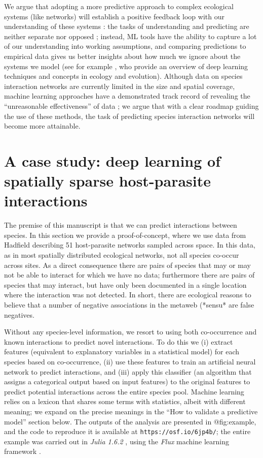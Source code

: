 We argue that adopting a more predictive approach to complex ecological
systems (like networks) will establish a positive feedback loop with our
understanding of these systems \cite{Houlahan2017PriPre}: the tasks of
understanding and predicting are neither separate nor opposed
\cite{Maris2017PreEco}; instead, ML tools have the ability to capture a
lot of our understanding into working assumptions, and comparing
predictions to empirical data gives us better insights about how much we
ignore about the systems we model (see for example
\cite{Borowiec2021DeeLea}, who provide an overview of deep learning techniques
and concepts in ecology and evolution). Although data on species
interaction networks are currently limited in the size and spatial
coverage, machine learning approaches have a demonstrated track record
of revealing the ``unreasonable effectiveness'' of data
\cite{Halevy2009UnrEff}; we argue that with a clear roadmap guiding the
use of these methods, the task of predicting species interaction
networks will become more attainable.

\section{A case study: deep learning of spatially sparse host-parasite
interactions}\label{a-case-study-deep-learning-of-spatially-sparse-host-parasite-interactions}

The premise of this manuscript is that we can predict interactions
between species. In this section we provide a proof-of-concept, where we
use data from Hadfield\cite{Hadfield2014TalTwo} describing 51 host-parasite networks
sampled across space. In this data, as in most spatially distributed
ecological networks, not all species co-occur across sites. As a direct
consequence there are pairs of species that may or may not be able to
interact for which we have no data; furthermore there are pairs of
species that may interact, but have only been documented in a single
location where the interaction was not detected. In short, there are
ecological reasons to believe that a number of negative associations in
the metaweb (*sensu* \cite{Dunne2006NetStr} are false negatives.

Without any species-level information, we resort to using both
co-occurrence and known interactions to predict novel interactions. To
do this we (i) extract features (equivalent to explanatory variables in
a statistical model) for each species based on co-occurrence, (ii) use
these features to train an artificial neural network to predict
interactions, and (iii) apply this classifier (an algorithm that assigns
a categorical output based on input features) to the original features
to predict potential interactions across the entire species pool.
Machine learning relies on a lexicon that shares some terms with
statistics, albeit with different meaning; we expand on the precise
meanings in the ``How to validate a predictive model'' section below.
The outputs of the analysis are presented in @fig:example, and the code
to reproduce it is available at \texttt{https://osf.io/6jp4b/}; the
entire example was carried out in \emph{Julia 1.6.2}
\cite{Bezanson2017JulFre}, using the \emph{Flux} machine learning
framework \cite{Innes2018FluEle}.

